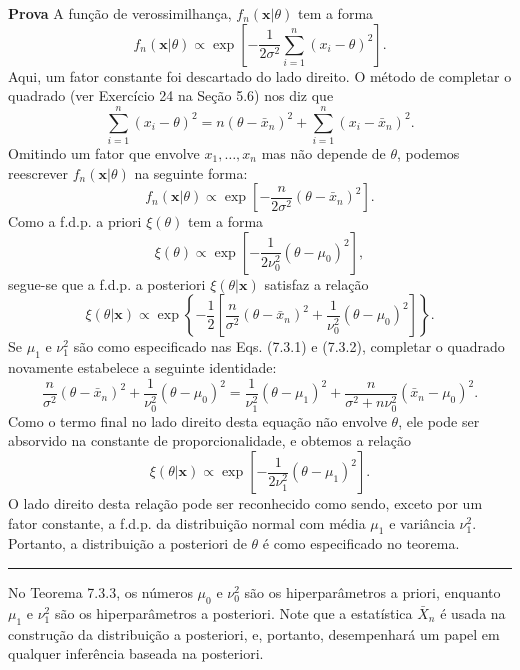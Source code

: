 \noindent\textbf{Prova} \quad A função de verossimilhança, $f_n(\mathbf{x}|\theta)$ tem a forma
$$ f_n(\mathbf{x}|\theta) \propto \exp\left[-\frac{1}{2\sigma^2}\sum_{i=1}^{n}(x_i-\theta)^2\right]. $$
Aqui, um fator constante foi descartado do lado direito. O método de completar o quadrado (ver Exercício 24 na Seção 5.6) nos diz que
$$ \sum_{i=1}^{n}(x_i-\theta)^2 = n(\theta-\bar{x}_n)^2 + \sum_{i=1}^{n}(x_i-\bar{x}_n)^2. $$
Omitindo um fator que envolve $x_1, \dots, x_n$ mas não depende de $\theta$, podemos reescrever $f_n(\mathbf{x}|\theta)$ na seguinte forma:
$$ f_n(\mathbf{x}|\theta) \propto \exp\left[-\frac{n}{2\sigma^2}(\theta-\bar{x}_n)^2\right]. $$
Como a f.d.p. a priori $\xi(\theta)$ tem a forma
$$ \xi(\theta) \propto \exp\left[-\frac{1}{2\nu_0^2}(\theta-\mu_0)^2\right], $$
segue-se que a f.d.p. a posteriori $\xi(\theta|\mathbf{x})$ satisfaz a relação
$$ \xi(\theta|\mathbf{x}) \propto \exp\left\{-\frac{1}{2}\left[\frac{n}{\sigma^2}(\theta-\bar{x}_n)^2+\frac{1}{\nu_0^2}(\theta-\mu_0)^2\right]\right\}. $$
Se $\mu_1$ e $\nu_1^2$ são como especificado nas Eqs. (7.3.1) e (7.3.2), completar o quadrado novamente estabelece a seguinte identidade:
$$ \frac{n}{\sigma^2}(\theta-\bar{x}_n)^2+\frac{1}{\nu_0^2}(\theta-\mu_0)^2 = \frac{1}{\nu_1^2}(\theta-\mu_1)^2 + \frac{n}{\sigma^2+n\nu_0^2}(\bar{x}_n-\mu_0)^2. $$
Como o termo final no lado direito desta equação não envolve $\theta$, ele pode ser absorvido na constante de proporcionalidade, e obtemos a relação
$$ \xi(\theta|\mathbf{x}) \propto \exp\left[-\frac{1}{2\nu_1^2}(\theta-\mu_1)^2\right]. $$
O lado direito desta relação pode ser reconhecido como sendo, exceto por um fator constante, a f.d.p. da distribuição normal com média $\mu_1$ e variância $\nu_1^2$. Portanto, a distribuição a posteriori de $\theta$ é como especificado no teorema. \rule{0.5em}{0.5em}

\vspace{1cm}
No Teorema 7.3.3, os números $\mu_0$ e $\nu_0^2$ são os hiperparâmetros a priori, enquanto $\mu_1$ e $\nu_1^2$ são os hiperparâmetros a posteriori. Note que a estatística $\bar{X}_n$ é usada na construção da distribuição a posteriori, e, portanto, desempenhará um papel em qualquer inferência baseada na posteriori.


